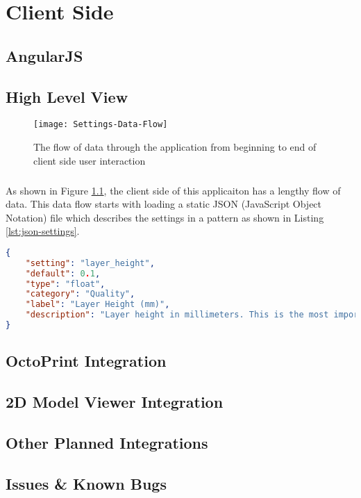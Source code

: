 \chapter{Client Side}

\section{AngularJS}

\section{High Level View}
\begin{figure}[!ht]
  \centering
  \texttt{[image: Settings-Data-Flow]}
  \caption{The flow of data through the application from beginning to end of client side user interaction}
  \label{fig:settings-data-flow}
\end{figure}

\paragraph{}
As shown in Figure \ref{fig:settings-data-flow}, the client side of this applicaiton has a lengthy flow of data.
This data flow starts with loading a static JSON (JavaScript Object Notation) file which describes the settings in a pattern as shown in Listing \ref{lst:json-settings}.
\begin{lstlisting}[language=json, label={lst:json-settings}, caption=A sample from a static settings file in JSON format.]
{
    "setting": "layer_height",
    "default": 0.1,
    "type": "float",
    "category": "Quality",
    "label": "Layer Height (mm)",
    "description": "Layer height in millimeters. This is the most important setting to determine the quality of your print. Normal quality prints are 0.1mm, high quality is 0.06mm. You can go up to 0.25mm."
}
\end{lstlisting}

\section{OctoPrint Integration}
\section{2D Model Viewer Integration}
\section{Other Planned Integrations}

\section{Issues \& Known Bugs}


